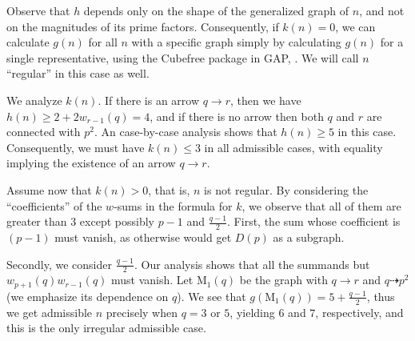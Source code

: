 \documentclass[a4paper, 12pt]{article}
\newcommand{\m}[1]{\text{M}_{#1}}
\theoremstyle{plain}
\theoremstyle{definition}
\begin{document}
Observe that $h$ depends only on the shape of the generalized graph of $n$, and not on the magnitudes of its prime factors. Consequently, if $k(n) = 0$, we can calculate $g(n)$ for all $n$ with a specific graph simply by calculating $g(n)$ for a single representative, using the Cubefree package in GAP{\cite{GAP4}, \cite{cubefreepkg}}. We will call $n$ ``regular'' in this case as well.

We analyze $k(n)$. If there is an arrow $q \rightarrow r$, then we have $h(n) \ge 2 + 2w_{r - 1}(q) = 4$, and if there is no arrow then both $q$ and $r$ are connected with $p^2$. An case-by-case analysis shows that $h(n) \ge 5$ in this case. Consequently, we must have $k(n) \le 3$ in all admissible cases, with equality implying the existence of an arrow $q \rightarrow r$.

Assume now that $k(n) > 0$, that is, $n$ is not regular. By considering the ``coefficients'' of the $w$-sums in the formula for $k$, we observe that all of them are greater than $3$ except possibly $p - 1$ and $\frac{q - 1}{2}$. First, the sum whose coefficient is $(p - 1)$ must vanish, as otherwise would get $D(p)$ as a subgraph.

Secondly, we consider $\frac{q - 1}{2}$. Our analysis shows that all the summands but $w_{p + 1}(q)w_{r - 1}(q)$ must vanish. Let $\m1(q)$ be the graph with $q \rightarrow r$ and $q \dashrightarrow p^2$ (we emphasize its dependence on $q$). We see that $g(\m1(q)) = 5 + \frac{q - 1}{2}$, thus we get admissible $n$ precisely when $q = 3$ or $5$, yielding $6$ and $7$, respectively, and this is the only irregular admissible case.
\end{document}
